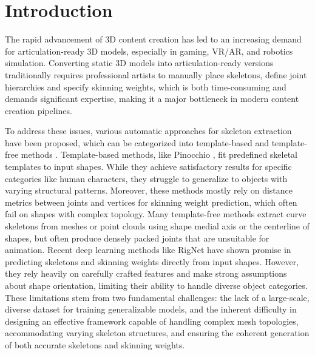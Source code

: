 \section{Introduction}
\label{sec:intro}


The rapid advancement of 3D content creation has led to an increasing demand for articulation-ready 3D models, especially in gaming, VR/AR, and robotics simulation. Converting static 3D models into articulation-ready versions traditionally requires professional artists to manually place skeletons, define joint hierarchies and specify skinning weights, which is both time-consuming and demands significant expertise, making it a major bottleneck in modern content creation pipelines.


To address these issues, various automatic approaches for skeleton extraction have been proposed, which can be categorized into template-based \cite{baran2007automatic, li2021learning} and template-free methods \cite{xu2020rignet, xu2019predicting, huang2013l1, au2008skeleton}. Template-based methods, like Pinocchio \cite{baran2007automatic}, fit predefined skeletal templates to input shapes. While they achieve satisfactory results for specific categories like human characters, they struggle to generalize to objects with varying structural patterns. Moreover, these methods mostly rely on distance metrics between joints and vertices for skinning weight prediction, which often fail on shapes with complex topology. Many template-free methods \cite{huang2013l1, au2008skeleton, cao2010point, lin2021point2skeleton, tagliasacchi2012mean} extract curve skeletons from meshes or point clouds using shape medial axis or the centerline of shapes, but often produce densely packed joints that are unsuitable for animation.
Recent deep learning methods like RigNet \cite{xu2020rignet} have shown promise in predicting skeletons and skinning weights directly from input shapes. However, they rely heavily on carefully crafted features and make strong assumptions about shape orientation, limiting their ability to handle diverse object categories. These limitations stem from two fundamental challenges: the lack of a large-scale, diverse dataset for training generalizable models, and the inherent difficulty in designing an effective framework capable of handling complex mesh topologies, accommodating varying skeleton structures, and ensuring the coherent generation of both accurate skeletons and skinning weights.


